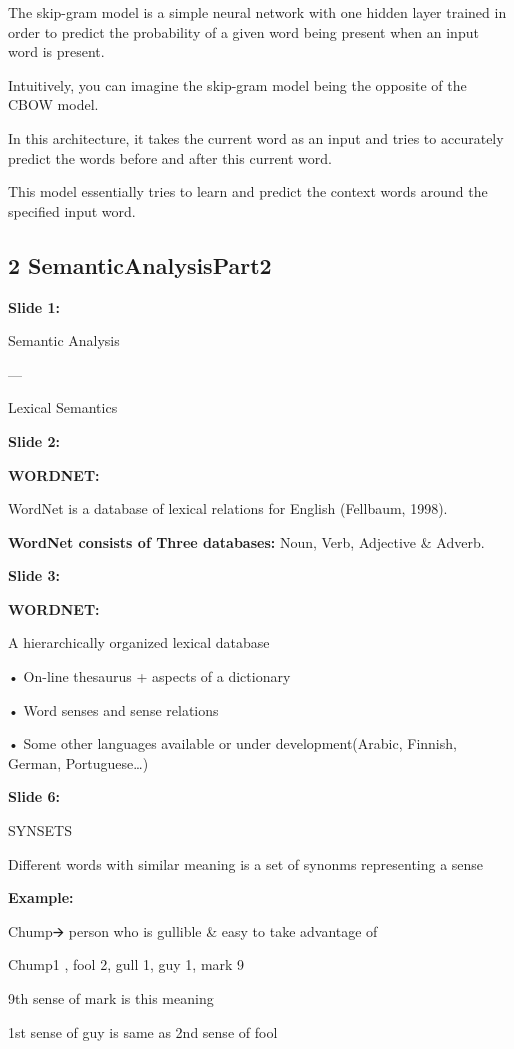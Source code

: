 \documentclass[11pt,a4paper]{article}
\begin{document}
The skip-gram model is a simple neural network with one hidden layer trained in order to predict the probability of a given word being present when an input word is present.

Intuitively, you can imagine the skip-gram model being the opposite of the CBOW model.

In this architecture, it takes the current word as an input and tries to accurately predict the words before and after this current word.

This model essentially tries to learn and predict the context words around the specified input word.


\subsection{2 SemanticAnalysisPart2}

\textbf{Slide 1:}

Semantic Analysis

---

Lexical Semantics

\textbf{Slide 2:}

\textbf{WORDNET:} 

WordNet is a database of lexical relations for English (Fellbaum, 1998).

\textbf{WordNet consists of Three databases:}  Noun, Verb, Adjective \& Adverb.

\textbf{Slide 3:}

\textbf{WORDNET:} 

A hierarchically organized lexical database

• On-line thesaurus + aspects of a dictionary

• Word senses and sense relations

• Some other languages available or under development(Arabic, Finnish, German, Portuguese…)

\textbf{Slide 6:}

SYNSETS

Different words with similar meaning is a set of synonms representing a sense

\textbf{Example:} 

Chump🡪 person who is gullible & easy to take advantage of

{Chump1 , fool 2, gull 1, guy 1, mark 9}

9th sense of mark is this meaning

1st sense of guy is same as 2nd sense of fool
\end{document}
